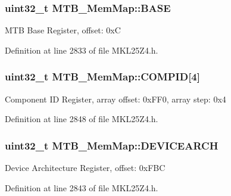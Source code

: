 \subsubsection[{\texorpdfstring{B\+A\+SE}{BASE}}]{\setlength{\rightskip}{0pt plus 5cm}uint32\+\_\+t M\+T\+B\+\_\+\+Mem\+Map\+::\+B\+A\+SE}\hypertarget{struct_m_t_b___mem_map_a11667e8893e740c2275248dafcc874ed}{}\label{struct_m_t_b___mem_map_a11667e8893e740c2275248dafcc874ed}
M\+TB Base Register, offset\+: 0xC 

Definition at line 2833 of file M\+K\+L25\+Z4.\+h.

\subsubsection[{\texorpdfstring{C\+O\+M\+P\+ID}{COMPID}}]{\setlength{\rightskip}{0pt plus 5cm}uint32\+\_\+t M\+T\+B\+\_\+\+Mem\+Map\+::\+C\+O\+M\+P\+ID\mbox{[}4\mbox{]}}\hypertarget{struct_m_t_b___mem_map_aad4a8dcad1e9b3d04375b85c6c37f09f}{}\label{struct_m_t_b___mem_map_aad4a8dcad1e9b3d04375b85c6c37f09f}
Component ID Register, array offset\+: 0x\+F\+F0, array step\+: 0x4 

Definition at line 2848 of file M\+K\+L25\+Z4.\+h.

\subsubsection[{\texorpdfstring{D\+E\+V\+I\+C\+E\+A\+R\+CH}{DEVICEARCH}}]{\setlength{\rightskip}{0pt plus 5cm}uint32\+\_\+t M\+T\+B\+\_\+\+Mem\+Map\+::\+D\+E\+V\+I\+C\+E\+A\+R\+CH}\hypertarget{struct_m_t_b___mem_map_a64a9fe1c83fa72b2b38696ed80856b73}{}\label{struct_m_t_b___mem_map_a64a9fe1c83fa72b2b38696ed80856b73}
Device Architecture Register, offset\+: 0x\+F\+BC 

Definition at line 2843 of file M\+K\+L25\+Z4.\+h.

